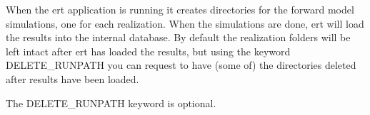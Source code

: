 \documentclass[letterpaper,10pt,english]{sphinxmanual}
\begin{document}
\begin{sphinxShadowBox}

When the ert application is running it creates directories for
the forward model simulations, one for each realization. When
the simulations are done, ert will load the results into the
internal database. By default the realization folders will be
left intact after ert has loaded the results, but using the
keyword DELETE\_RUNPATH you can request to have (some of) the
directories deleted after results have been loaded.


%
\begin{sphinxVerbatim}[commandchars=\\\{\}]
      
 
\end{sphinxVerbatim}


%
\begin{sphinxVerbatim}[commandchars=\\\{\}]
             
      
\end{sphinxVerbatim}

The DELETE\_RUNPATH keyword is optional.
\end{sphinxShadowBox}
\label{\detokenize{keywords/index:end-date}}
\end{document}
